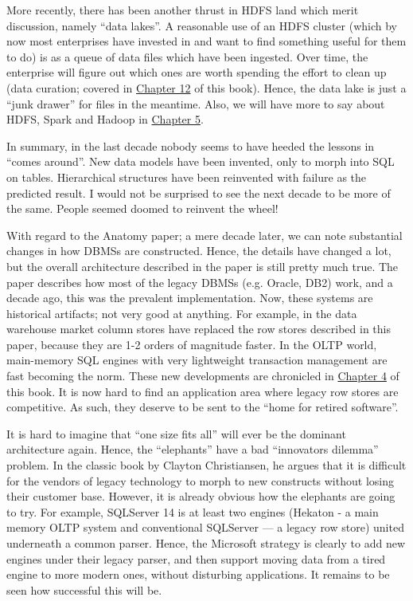 \documentclass[b5paper,11pt,twoside,openright]{book}
\begin{document}
More recently, there has been another thrust in HDFS land which merit
discussion, namely ``data lakes''. A reasonable use of an HDFS cluster
(which by now most enterprises have invested in and want to find
something useful for them to do) is as a queue of data files which have
been ingested. Over time, the enterprise will figure out which ones are
worth spending the effort to clean up (data curation; covered in
\hyperref[ch12-dataintegration]{Chapter 12} of this book). Hence, the
data lake is just a ``junk drawer'' for files in the meantime. Also, we
will have more to say about HDFS, Spark and Hadoop in
\hyperref[ch5-dataflow]{Chapter 5}.

In summary, in the last decade nobody seems to have heeded the lessons
in ``comes around''. New data models have been invented, only to morph
into SQL on tables. Hierarchical structures have been reinvented with
failure as the predicted result. I would not be surprised to see the
next decade to be more of the same. People seemed doomed to reinvent the
wheel!

With regard to the Anatomy paper; a mere decade later, we can note
substantial changes in how DBMSs are constructed. Hence, the details
have changed a lot, but the overall architecture described in the paper
is still pretty much true. The paper describes how most of the legacy
DBMSs (e.g. Oracle, DB2) work, and a decade ago, this was the prevalent
implementation. Now, these systems are historical artifacts; not very
good at anything. For example, in the data warehouse market column
stores have replaced the row stores described in this paper, because
they are 1-2 orders of magnitude faster. In the OLTP world, main-memory
SQL engines with very lightweight transaction management are fast
becoming the norm. These new developments are chronicled in
\hyperref[ch4-newdbms]{Chapter 4} of this book. It is now hard to find
an application area where legacy row stores are competitive. As such,
they deserve to be sent to the ``home for retired software''.

It is hard to imagine that ``one size fits all'' will ever be the
dominant architecture again. Hence, the ``elephants'' have a bad
``innovators dilemma'' problem. In the classic book by Clayton
Christiansen, he argues that it is difficult for the vendors of legacy
technology to morph to new constructs without losing their customer
base. However, it is already obvious how the elephants are going to try.
For example, SQLServer 14 is at least two engines (Hekaton - a main
memory OLTP system and conventional SQLServer --- a legacy row store)
united underneath a common parser. Hence, the Microsoft strategy is
clearly to add new engines under their legacy parser, and then support
moving data from a tired engine to more modern ones, without disturbing
applications. It remains to be seen how successful this will be.
\end{document}
